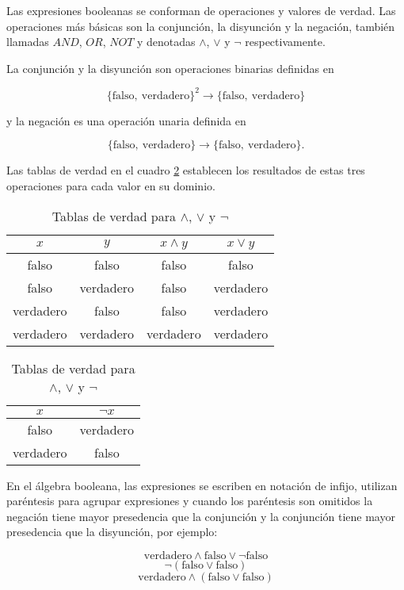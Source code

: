 Las expresiones booleanas se conforman de operaciones y valores de verdad. Las operaciones más básicas son la conjunción, la disyunción y la negación, también llamadas \( AND \), \( OR \), \( NOT \) y denotadas \( \land \), \( \lor \) y \( \lnot \) respectivamente.

La conjunción y la disyunción son operaciones binarias definidas en

\[ \{ \mathrm{falso},\ \mathrm{verdadero} \}^{2} \to \{ \mathrm{falso},\ \mathrm{verdadero} \} \]

y la negación es una operación unaria definida en

\[ \{ \mathrm{falso},\ \mathrm{verdadero} \} \to \{ \mathrm{falso},\ \mathrm{verdadero} \}. \]

Las tablas de verdad en el cuadro \ref{tab:and-or-not} establecen los resultados de estas tres operaciones para cada valor en su dominio.

\begin{table}[h!]
  \centering
  \small
  \begin{tabular}{|c|c|c|c|}
    \hline
    \( x \) & \( y \) & \( x \land y \) & \( x \lor y \) \\ [0.5ex]
    \hline\hline
    falso & falso & falso & falso \\
    falso & verdadero & falso & verdadero \\
    verdadero & falso & falso & verdadero \\
    verdadero & verdadero & verdadero & verdadero \\
    \hline
  \end{tabular}
  \hfill
  \begin{tabular}{|c|c|}
    \hline
    \( x \) & \( \lnot x \) \\ [0.5ex]
    \hline\hline
    falso & verdadero  \\
    verdadero & falso \\
    \hline
  \end{tabular}
  \caption{Tablas de verdad para \( \land \), \( \lor \) y \( \lnot \)}
  \label{tab:and-or-not}
\end{table}

En el álgebra booleana, las expresiones se escriben en notación de infijo, utilizan paréntesis para agrupar expresiones y cuando los paréntesis son omitidos la negación tiene mayor presedencia que la conjunción y la conjunción tiene mayor presedencia que la disyunción, por ejemplo:

\[ \mathrm{verdadero} \land \mathrm{falso} \lor \lnot \mathrm{falso} \]
\[ \lnot (\mathrm{falso} \lor \mathrm{falso}) \]
\[ \mathrm{verdadero} \land (\mathrm{falso} \lor \mathrm{falso}) \]

